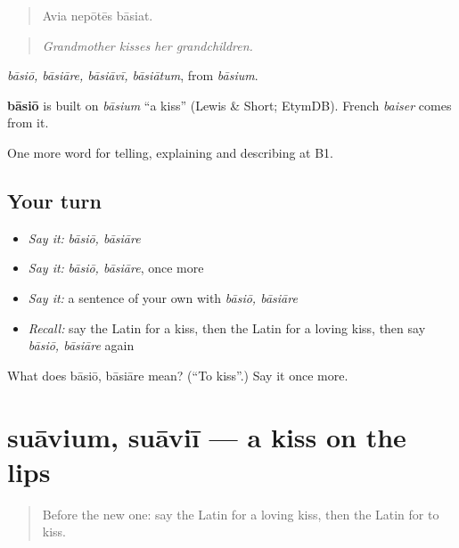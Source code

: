 \begin{quote}
Avia nepōtēs bāsiat.
\end{quote}

\begin{quote}
\emph{Grandmother kisses her grandchildren.}
\end{quote}

\emph{bāsiō, bāsiāre, bāsiāvī, bāsiātum}, from \emph{bāsium}.

\begin{cousinweb}
\textbf{bāsiō} is built on \emph{bāsium} \textquotedblleft{}a kiss\textquotedblright{} (Lewis \& Short; EtymDB). French \emph{baiser} comes from it.
\end{cousinweb}

\begin{grammarlens}[title={What you've built}]
One more word for telling, explaining and describing at B1.
\end{grammarlens}

\subsection*{Your turn}
\begin{itemize}
\raggedright
  \item \emph{Say it:} \emph{bāsiō, bāsiāre}
  \item \emph{Say it:} \emph{bāsiō, bāsiāre}, once more
  \item \emph{Say it:} a sentence of your own with \emph{bāsiō, bāsiāre}
  \item \emph{Recall:} say the Latin for a kiss, then the Latin for a loving kiss, then say \emph{bāsiō, bāsiāre} again
\end{itemize}

\begin{tcolorbox}[breakable,colback=teal!4,colframe=teal!35!black,title={Before you move on}]
What does bāsiō, bāsiāre mean? (\textquotedblleft{}To kiss\textquotedblright{}.) Say it once more.
\end{tcolorbox}
\section[suāvium, suāviī]{suāvium, suāviī — a kiss on the lips}

\label{lesson:LA-C534-suavium}



\begin{quote}
Before the new one: say the Latin for a loving kiss, then the Latin for to kiss.
\end{quote}

